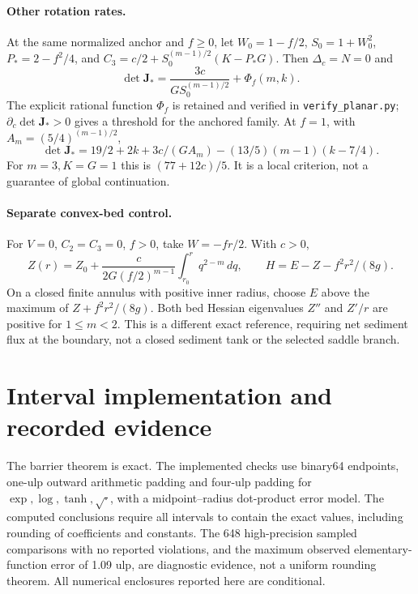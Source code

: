 \documentclass[12pt,a4paper,oneside]{report}
\numberwithin{equation}{chapter}
\theoremstyle{definition}
\theoremstyle{remark}\newtheorem{remark}[theorem]{Remark}
\DeclareRobustCommand{\code}[1]{\nolinkurl{#1}}
\newif\ifreviewmarks
\DeclareRobustCommand{\review}[1]{{\ifreviewmarks\color{authorblue}\fi #1}}
\begin{document}
\paragraph{Other rotation rates.}
At the same normalized anchor and $f\ge0$, let $W_0=1-f/2$, $S_0=1+W_0^2$, $P_*=2-f^2/4$, and $C_3=c/2+S_0^{(m-1)/2}(K-P_*G)$. Then $\Delta_c=N=0$ and
\[
 \det\mathbf J_*=\frac{3c}{G S_0^{(m-1)/2}}+\Phi_f(m,k).
\]
The explicit rational function $\Phi_f$ is retained and verified in \code{verify_planar.py}; $\partial_c\det\mathbf J_*>0$ gives a threshold for the anchored family. At $f=1$, with $A_m=(5/4)^{(m-1)/2}$,
\[
 \det\mathbf J_*=19/2+2k+3c/(GA_m)-(13/5)(m-1)(k-7/4).
\]
For $m=3,K=G=1$ this is $(77+12c)/5$. It is a local criterion, not a guarantee of global continuation.

\paragraph{Separate convex-bed control.}
For $V=0$, $C_2=C_3=0$, $f>0$, take $W=-fr/2$. With $c>0$,
\[
 Z(r)=Z_0+\frac{c}{2G(f/2)^{m-1}}\int_{r_0}^r q^{2-m}\,dq,
 \qquad H=E-Z-f^2r^2/(8g).
\]
On a closed finite annulus with positive inner radius, choose $E$ above the maximum of $Z+f^2r^2/(8g)$. Both bed Hessian eigenvalues $Z''$ and $Z'/r$ are positive for $1\le m<2$. This is a different exact reference, requiring net sediment flux at the boundary, not a closed sediment tank or the selected saddle branch.
\section{Interval implementation and recorded evidence}\label{app:interval-params}
\review{The barrier theorem is exact. The implemented checks use binary64 endpoints, one-ulp outward arithmetic padding and four-ulp padding for $\exp,\log,\tanh,\sqrt{\cdot}$, with a midpoint--radius dot-product error model. The computed conclusions require all intervals to contain the exact values, including rounding of coefficients and constants. The 648 high-precision sampled comparisons with no reported violations, and the maximum observed elementary-function error of 1.09 ulp, are diagnostic evidence, not a uniform rounding theorem. All numerical enclosures reported here are conditional.}
\end{document}
